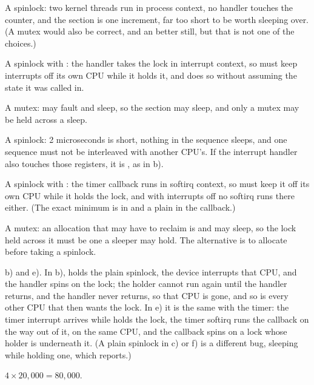  A spinlock: two kernel threads run in process context, no handler touches the counter,
and the section is one increment, far too short to be worth sleeping over. (A mutex would also be
correct, and an  better still, but that is not one of the choices.)

 A spinlock with : the handler takes the lock in interrupt context, so
 must keep interrupts off its own CPU while it holds it, and  does so
without assuming the state it was called in.

 A mutex:  may fault and sleep, so the section may sleep, and only a
mutex may be held across a sleep.

 A spinlock: 2 microseconds is short, nothing in the sequence sleeps, and one sequence must
not be interleaved with another CPU's. If the interrupt handler also touches those registers, it is
, as in b).

 A spinlock with : the timer callback runs in softirq context, so
 must keep it off its own CPU while it holds the lock, and with interrupts off no
softirq runs there either. (The exact minimum is  in  and a plain
 in the callback.)

 A mutex: an allocation that may have to reclaim is  and may sleep, so
the lock held across it must be one a sleeper may hold. The alternative is to allocate before
taking a spinlock.

 b) and e). In b),  holds the plain spinlock, the device interrupts that CPU,
and the handler spins on the lock; the holder cannot run again until the handler returns, and the
handler never returns, so that CPU is gone, and so is every other CPU that then wants the lock. In
e) it is the same with the timer: the timer interrupt arrives while  holds the lock,
the timer softirq runs the callback on the way out of it, on the same CPU, and the callback spins on
a lock whose holder is underneath it. (A plain spinlock in c) or f) is a different bug, sleeping
while holding one, which  reports.)


 $4 \times 20{,}000 = 80{,}000$.


